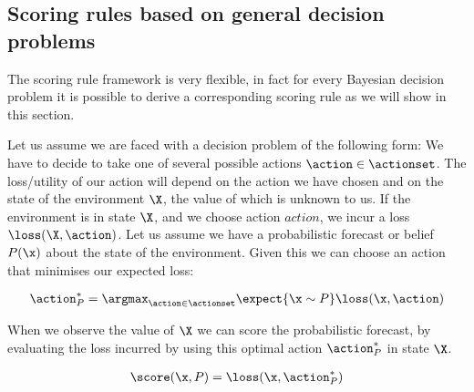 \subsection{Scoring rules based on general decision problems}

The scoring rule framework is very flexible, in fact for every Bayesian decision problem it is possible to derive a corresponding scoring rule as we will show in this section.

Let us assume we are faced with a decision problem of the following form: We have to decide to take one of several possible actions $\action\in\actionset$. The loss/utility of our action will depend on the action we have chosen and on the state of the environment $\X$, the value of which is unknown to us. If the environment is in state $\X$, and we choose action $action$, we incur a loss $\loss(\X,\action)$. Let us assume we have a probabilistic forecast or belief $P(\x)$ about the state of the environment. Given this we can choose an action that minimises our expected loss:

\begin{align}
	\action^{*}_{P} = \argmax_{\action\in\actionset} \expect{\x\sim P} \loss(\x,\action)
\end{align}

When we observe the value of $\X$ we can score the probabilistic forecast, by evaluating the loss incurred by using this optimal action $\action^{*}_{P}$ in state $\X$.

\begin{align}
	\score(\x,P) = \loss(\x,\action^{*}_{P})
\end{align}